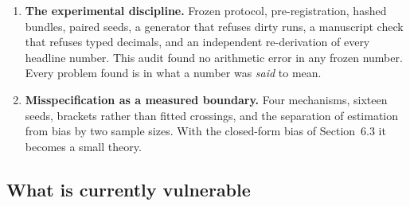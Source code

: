\documentclass[11pt,a4paper]{article}
\newcommand{\hi}[1]{\textbf{#1}}
\theoremstyle{definition}
\theoremstyle{remark}
\begin{document}
\begin{enumerate}
\item \hi{The experimental discipline.} Frozen protocol, pre-registration, hashed bundles, paired seeds, a generator that refuses dirty runs, a manuscript check that refuses typed decimals, and an independent re-derivation of every headline number. This audit found no arithmetic error in any frozen number. Every problem found is in what a number was \emph{said} to mean.
\item \hi{Misspecification as a measured boundary.} Four mechanisms, sixteen seeds, brackets rather than fitted crossings, and the separation of estimation from bias by two sample sizes. With the closed-form bias of Section~6.3 it becomes a small theory.
\end{enumerate}

\subsection{What is currently vulnerable}
\end{document}
